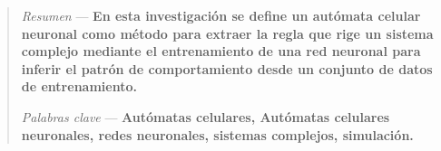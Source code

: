 \begin{abstract}
	\noindent \textit{Resumen} --- \textbf{En esta investigación se define un autómata celular neuronal como método para extraer la regla que rige un sistema complejo mediante el entrenamiento de una red neuronal para inferir el patrón de comportamiento desde un conjunto de datos de entrenamiento.}
	
	\vspace{0.8em}
	\noindent \textit{Palabras clave} --- \textbf{Autómatas celulares, Autómatas celulares neuronales, redes neuronales, sistemas complejos, simulación.}
\end{abstract}